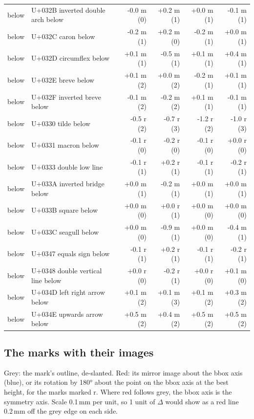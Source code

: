 \documentclass[10pt]{article}
\begin{document}
{\begin{longtable}{@{}llrrrr@{}}
below & U+032B inverted double arch below & -0.0 m (0) & +0.2 m (1) & +0.0 m (1) & -0.1 m (1)\\
below & U+032C caron below & -0.2 m (1) & +0.2 m (0) & -0.2 m (1) & +0.0 m (1)\\
below & U+032D circumflex below & +0.1 m (1) & -0.5 m (1) & +0.1 m (1) & +0.4 m (1)\\
below & U+032E breve below & +0.1 m (2) & +0.0 m (2) & -0.2 m (1) & +0.1 m (1)\\
below & U+032F inverted breve below & -0.1 m (2) & -0.2 m (2) & +0.1 m (1) & -0.1 m (1)\\
below & U+0330 tilde below & -0.5 r (2) & -0.7 r (3) & -1.2 r (2) & -1.0 r (3)\\
below & U+0331 macron below & -0.1 r (0) & -0.2 r (0) & -0.1 r (0) & +0.0 r (0)\\
below & U+0333 double low line & -0.1 r (1) & +0.2 r (1) & -0.1 r (1) & -0.2 r (1)\\
below & U+033A inverted bridge below & +0.0 m (1) & -0.2 m (1) & +0.0 m (1) & +0.0 m (1)\\
below & U+033B square below & +0.0 m (0) & +0.0 r (1) & +0.0 m (0) & +0.0 m (0)\\
below & U+033C seagull below & +0.0 m (0) & -0.9 m (1) & +0.0 m (0) & -0.4 m (1)\\
below & U+0347 equals sign below & -0.1 r (1) & +0.2 r (1) & -0.1 r (1) & -0.2 r (1)\\
below & U+0348 double vertical line below & +0.0 r (0) & -0.2 r (1) & +0.0 r (0) & +0.1 m (0)\\
below & U+034D left right arrow below & +0.1 m (2) & +0.1 m (3) & +0.1 m (2) & +0.3 m (2)\\
below & U+034E upwards arrow below & +0.5 m (2) & +0.4 m (2) & +0.5 m (2) & +0.5 m (2)\\
\end{longtable}}
\clearpage
\subsection*{The marks with their images}
Grey: the mark's outline, de-slanted. Red: its mirror image about the bbox axis (blue), or its rotation by 180° about the point on the bbox axis at the best height, for the marks marked r.
Where red follows grey, the bbox axis is the symmetry axis. Scale 0.1\,mm per unit, so 1 unit of $\Delta$ would show as a red line 0.2\,mm off the grey edge on each side.
\end{document}
